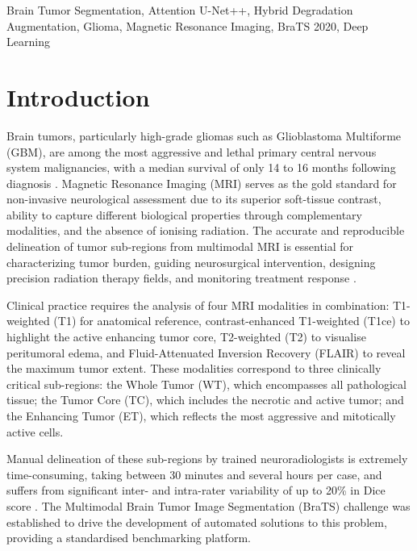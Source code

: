 \documentclass[conference]{IEEEtran}
\begin{document}
\begin{IEEEkeywords}
Brain Tumor Segmentation, Attention U-Net++, Hybrid Degradation Augmentation, Glioma, Magnetic Resonance Imaging, BraTS 2020, Deep Learning
\end{IEEEkeywords}

\section{Introduction}

Brain tumors, particularly high-grade gliomas such as Glioblastoma Multiforme (GBM), are among the most aggressive and lethal primary central nervous system malignancies, with a median survival of only 14 to 16 months following diagnosis \cite{bakas2018identifying}. Magnetic Resonance Imaging (MRI) serves as the gold standard for non-invasive neurological assessment due to its superior soft-tissue contrast, ability to capture different biological properties through complementary modalities, and the absence of ionising radiation. The accurate and reproducible delineation of tumor sub-regions from multimodal MRI is essential for characterizing tumor burden, guiding neurosurgical intervention, designing precision radiation therapy fields, and monitoring treatment response \cite{menze2014multimodal}.

Clinical practice requires the analysis of four MRI modalities in combination: T1-weighted (T1) for anatomical reference, contrast-enhanced T1-weighted (T1ce) to highlight the active enhancing tumor core, T2-weighted (T2) to visualise peritumoral edema, and Fluid-Attenuated Inversion Recovery (FLAIR) to reveal the maximum tumor extent. These modalities correspond to three clinically critical sub-regions: the Whole Tumor (WT), which encompasses all pathological tissue; the Tumor Core (TC), which includes the necrotic and active tumor; and the Enhancing Tumor (ET), which reflects the most aggressive and mitotically active cells.

Manual delineation of these sub-regions by trained neuroradiologists is extremely time-consuming, taking between 30 minutes and several hours per case, and suffers from significant inter- and intra-rater variability of up to 20\% in Dice score \cite{menze2014multimodal}. The Multimodal Brain Tumor Image Segmentation (BraTS) challenge was established to drive the development of automated solutions to this problem, providing a standardised benchmarking platform.
\end{document}
